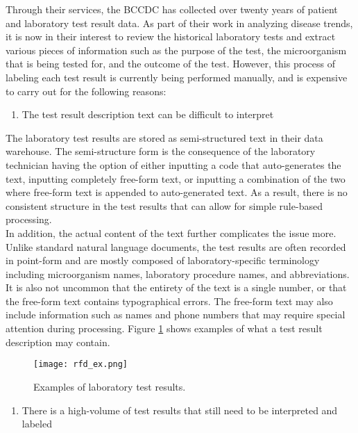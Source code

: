 \documentclass[11pt]{article}
\begin{document}
\noindent Through their services, the BCCDC has collected over twenty years of patient and laboratory test result data. As part of their work in analyzing disease trends, it is now in their interest to review the historical laboratory tests and extract various pieces of information such as the purpose of the test, the microorganism that is being tested for, and the outcome of the test. However, this process of labeling each test result is currently being performed manually, and is expensive to carry out for the following reasons:

\begin{enumerate}

\item[1.] The test result description text can be difficult to interpret

\end{enumerate}

The laboratory test results are stored as semi-structured text in their data warehouse. The semi-structure form is the consequence of the laboratory technician having the option of either inputting a code that auto-generates the text, inputting completely free-form text, or inputting a combination of the two where free-form text is appended to auto-generated text. As a result, there is no consistent structure in the test results that can allow for simple rule-based processing.
\\

In addition, the actual content of the text further complicates the issue more. Unlike standard natural language documents, the test results are often recorded in point-form and are mostly composed of laboratory-specific terminology including microorganism names, laboratory procedure names, and abbreviations. It is also not uncommon that the entirety of the text is a single number, or that the free-form text contains typographical errors. The free-form text may also include information such as names and phone numbers that may require special attention during processing. Figure \ref{test results figure} shows examples of what a test result description may contain.

\begin{figure}
    \centering
    \texttt{[image: rfd\_ex.png]}
    \caption{Examples of laboratory test results.}
    \label{test results figure}
\end{figure}


\begin{enumerate}

\item[2.] There is a high-volume of test results that still need to be interpreted and labeled

\end{enumerate}
\end{document}
